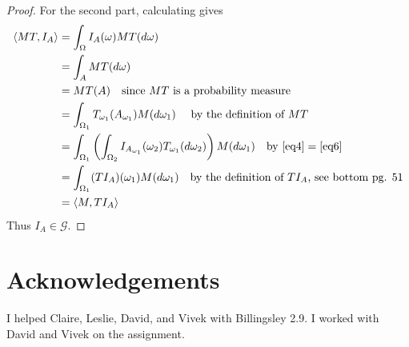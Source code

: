 \documentclass[letterpaper, 12pt]{article}
\newcommand{\cG}{\mathcal{G}}
\begin{document}
\begin{enumerate}
\begin{proof}
For the second part, calculating gives
\begin{align*}
\langle MT, I_A \rangle 
&= \int_{\Omega} I_A(\omega) MT(d\omega) \\
&= \int_A MT(d \omega) \\
&= MT(A) 
\quad
\text{since $MT$ is a probability measure}\\
&= \int_{\Omega_1} T_{\omega_1} (A_{\omega_1}) M (d \omega_1)
\quad \text{ by the definition of $MT$} \\
&= \int_{\Omega_1} \left( \int_{\Omega_2} I_{A_{\omega_1}}(\omega_2) T_{\omega_1}(d\omega_2) \right) M (d \omega_1)
\quad \text{by $\eqref{eq4} = \eqref{eq6}$}\\
&= \int_{\Omega_1} (TI_A)(\omega_1) M(d\omega_1) 
\quad \text{by the definition of $TI_A$, see bottom pg. 51}\\
&= \langle M, TI_A \rangle
\end{align*}
Thus $I_A \in \cG$.
\end{proof}
\end{enumerate}

\section*{Acknowledgements}
I helped Claire, Leslie, David, and Vivek with Billingsley 2.9. I worked with David and Vivek on the assignment.

\newpage
\end{document}
